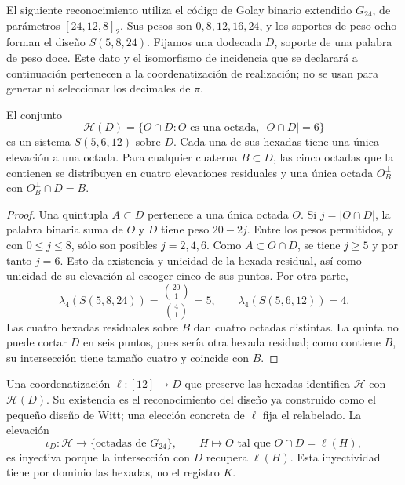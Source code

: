El siguiente reconocimiento utiliza el código de Golay binario
extendido $G_{24}$, de parámetros $[24,12,8]_2$. Sus pesos son
$0,8,12,16,24$, y los soportes de peso ocho forman el diseño
$S(5,8,24)$. Fijamos una dodecada $D$, soporte de una palabra de peso
doce. Este dato y el isomorfismo de incidencia que se declarará a
continuación pertenecen a la coordenatización de realización; no se usan para
generar ni seleccionar los decimales de $\pi$.

\begin{proposition}
\label{exc:residuo-binario}
El conjunto
\[
 \mathcal H(D)=
 \{O\cap D: O\text{ es una octada},\ |O\cap D|=6\}
\]
es un sistema $S(5,6,12)$ sobre $D$. Cada una de sus hexadas tiene
una única elevación a una octada. Para cualquier cuaterna $B\subset D$,
las cinco octadas que la contienen se distribuyen en cuatro elevaciones
residuales y una única octada $O_B^\perp$ con $O_B^\perp\cap D=B$.
\end{proposition}

\begin{proof}
Una quintupla $A\subset D$ pertenece a una única octada $O$. Si
$j=|O\cap D|$, la palabra binaria suma de $O$ y $D$ tiene peso
$20-2j$. Entre los pesos permitidos, y con $0\leq j\leq8$, sólo
son posibles $j=2,4,6$. Como $A\subset O\cap D$, se tiene $j\geq5$
y por tanto $j=6$. Esto da existencia y unicidad de la hexada
residual, así como unicidad de su elevación al escoger cinco de sus
puntos. Por otra parte,
\[
 \lambda_4(S(5,8,24))=\frac{\binom{20}1}{\binom41}=5,
 \qquad
 \lambda_4(S(5,6,12))=4.
\]
Las cuatro hexadas residuales sobre $B$ dan cuatro octadas distintas.
La quinta no puede cortar $D$ en seis puntos, pues sería otra hexada
residual; como contiene $B$, su intersección tiene tamaño cuatro y
coincide con $B$.
\end{proof}

Una coordenatización $\ell:[12]\to D$ que preserve las hexadas identifica
$\mathcal H$ con $\mathcal H(D)$. Su existencia es el reconocimiento
del diseño ya construido como el pequeño diseño de Witt; una elección
concreta de $\ell$ fija el relabelado. La elevación
\[
 \iota_D:\mathcal H\longrightarrow
       \{\text{octadas de }G_{24}\},
 \qquad H\longmapsto O\text{ tal que }O\cap D=\ell(H),
\]
es inyectiva porque la intersección con $D$ recupera $\ell(H)$.
Esta inyectividad tiene por dominio las hexadas, no el registro $K$.

